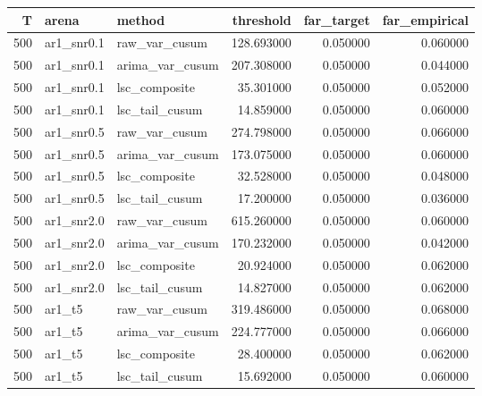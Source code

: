 \begin{tabular}{rllrrr}
\toprule
T & arena & method & threshold & far_target & far_empirical \\
\midrule
500 & ar1_snr0.1 & raw_var_cusum & 128.693000 & 0.050000 & 0.060000 \\
500 & ar1_snr0.1 & arima_var_cusum & 207.308000 & 0.050000 & 0.044000 \\
500 & ar1_snr0.1 & lsc_composite & 35.301000 & 0.050000 & 0.052000 \\
500 & ar1_snr0.1 & lsc_tail_cusum & 14.859000 & 0.050000 & 0.060000 \\
500 & ar1_snr0.5 & raw_var_cusum & 274.798000 & 0.050000 & 0.066000 \\
500 & ar1_snr0.5 & arima_var_cusum & 173.075000 & 0.050000 & 0.060000 \\
500 & ar1_snr0.5 & lsc_composite & 32.528000 & 0.050000 & 0.048000 \\
500 & ar1_snr0.5 & lsc_tail_cusum & 17.200000 & 0.050000 & 0.036000 \\
500 & ar1_snr2.0 & raw_var_cusum & 615.260000 & 0.050000 & 0.060000 \\
500 & ar1_snr2.0 & arima_var_cusum & 170.232000 & 0.050000 & 0.042000 \\
500 & ar1_snr2.0 & lsc_composite & 20.924000 & 0.050000 & 0.062000 \\
500 & ar1_snr2.0 & lsc_tail_cusum & 14.827000 & 0.050000 & 0.062000 \\
500 & ar1_t5 & raw_var_cusum & 319.486000 & 0.050000 & 0.068000 \\
500 & ar1_t5 & arima_var_cusum & 224.777000 & 0.050000 & 0.066000 \\
500 & ar1_t5 & lsc_composite & 28.400000 & 0.050000 & 0.062000 \\
500 & ar1_t5 & lsc_tail_cusum & 15.692000 & 0.050000 & 0.060000 \\
\bottomrule
\end{tabular}
